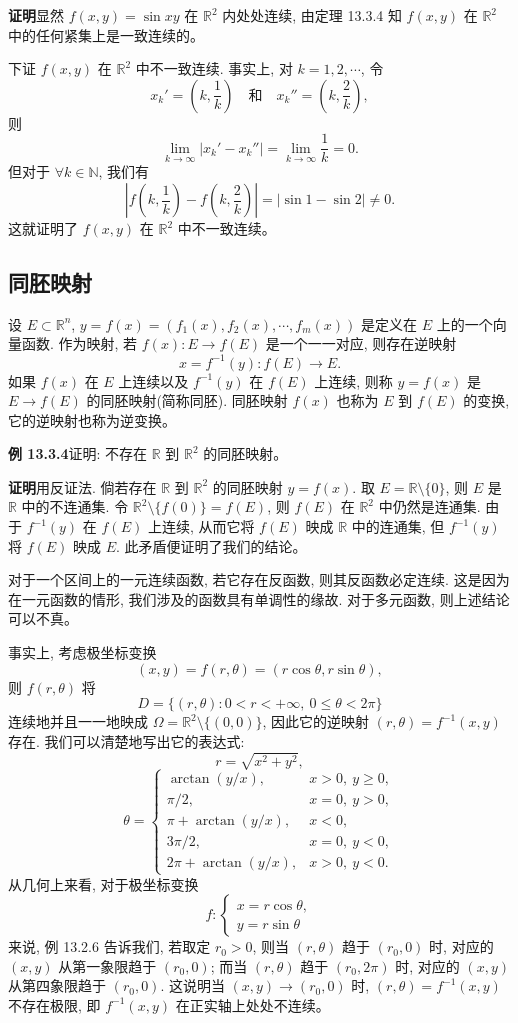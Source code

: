 \documentclass[UTF8, 12pt, fontset=fandol, oneside]{ctexart}
\begin{document}
\noindent\textbf{证明}\quad 显然 $f(x,y)=\sin xy$ 在 $\mathbb R^2$ 内处处连续, 由定理 13.3.4 知 $f(x,y)$ 在 $\mathbb R^2$ 中的任何紧集上是一致连续的。

下证 $f(x,y)$ 在 $\mathbb R^2$ 中不一致连续. 事实上, 对 $k=1,2,\cdots$, 令
\[
  x_k'=\left(k,\frac1k\right)\quad\text{和}\quad
  x_k''=\left(k,\frac2k\right),
\]
则
\[
  \lim_{k\to\infty}|x_k'-x_k''|=\lim_{k\to\infty}\frac1k=0.
\]
但对于 $\forall k\in\mathbb N$, 我们有
\[
  \left|f\left(k,\frac1k\right)-f\left(k,\frac2k\right)\right|
  =|\sin1-\sin2|\ne0.
\]
这就证明了 $f(x,y)$ 在 $\mathbb R^2$ 中不一致连续。

\subsection{同胚映射}

设 $E\subset\mathbb R^n$, $y=f(x)=(f_1(x),f_2(x),\cdots,f_m(x))$ 是定义在 $E$ 上的一个向量函数. 作为映射, 若 $f(x):E\to f(E)$ 是一个一一对应, 则存在逆映射
\[
  x=f^{-1}(y):f(E)\to E.
\]
如果 $f(x)$ 在 $E$ 上连续以及 $f^{-1}(y)$ 在 $f(E)$ 上连续, 则称 $y=f(x)$ 是 $E\to f(E)$ 的同胚映射(简称同胚). 同胚映射 $f(x)$ 也称为 $E$ 到 $f(E)$ 的变换, 它的逆映射也称为逆变换。

\noindent\textbf{例 13.3.4}\quad 证明: 不存在 $\mathbb R$ 到 $\mathbb R^2$ 的同胚映射。

\noindent\textbf{证明}\quad 用反证法. 倘若存在 $\mathbb R$ 到 $\mathbb R^2$ 的同胚映射 $y=f(x)$. 取 $E=\mathbb R\setminus\{0\}$, 则 $E$ 是 $\mathbb R$ 中的不连通集. 令 $\mathbb R^2\setminus\{f(0)\}=f(E)$, 则 $f(E)$ 在 $\mathbb R^2$ 中仍然是连通集. 由于 $f^{-1}(y)$ 在 $f(E)$ 上连续, 从而它将 $f(E)$ 映成 $\mathbb R$ 中的连通集, 但 $f^{-1}(y)$ 将 $f(E)$ 映成 $E$. 此矛盾便证明了我们的结论。

对于一个区间上的一元连续函数, 若它存在反函数, 则其反函数必定连续. 这是因为在一元函数的情形, 我们涉及的函数具有单调性的缘故. 对于多元函数, 则上述结论可以不真。

事实上, 考虑极坐标变换
\[
  (x,y)=f(r,\theta)=(r\cos\theta,r\sin\theta),
\]
则 $f(r,\theta)$ 将
\[
  D=\{(r,\theta):0<r<+\infty,\ 0\leqslant\theta<2\pi\}
\]
连续地并且一一地映成 $\Omega=\mathbb R^2\setminus\{(0,0)\}$, 因此它的逆映射 $(r,\theta)=f^{-1}(x,y)$ 存在. 我们可以清楚地写出它的表达式:
\[
  r=\sqrt{x^2+y^2},
\]
\[
  \theta=
  \begin{cases}
    \arctan(y/x), & x>0,\ y\geqslant0,\\
    \pi/2, & x=0,\ y>0,\\
    \pi+\arctan(y/x), & x<0,\\
    3\pi/2, & x=0,\ y<0,\\
    2\pi+\arctan(y/x), & x>0,\ y<0.
  \end{cases}
\]
从几何上来看, 对于极坐标变换
\[
  f:
  \begin{cases}
    x=r\cos\theta,\\
    y=r\sin\theta
  \end{cases}
\]
来说, 例 13.2.6 告诉我们, 若取定 $r_0>0$, 则当 $(r,\theta)$ 趋于 $(r_0,0)$ 时, 对应的 $(x,y)$ 从第一象限趋于 $(r_0,0)$; 而当 $(r,\theta)$ 趋于 $(r_0,2\pi)$ 时, 对应的 $(x,y)$ 从第四象限趋于 $(r_0,0)$. 这说明当 $(x,y)\to(r_0,0)$ 时, $(r,\theta)=f^{-1}(x,y)$ 不存在极限, 即 $f^{-1}(x,y)$ 在正实轴上处处不连续。
\end{document}

